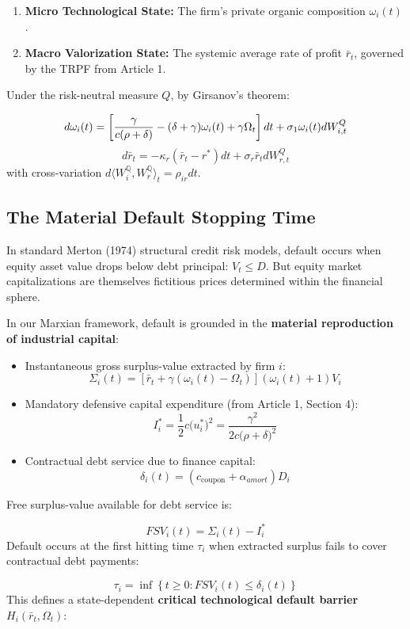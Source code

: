 \documentclass[11pt,letterpaper]{report}
\newcommand{\fitmath}[1]{\begingroup\setbox0=\hbox{$\displaystyle #1$}\ifdim\wd0>\linewidth\resizebox{\linewidth}{!}{$\displaystyle #1$}\else\displaystyle #1\fi\endgroup}
\begin{document}
\begin{enumerate}
\item \textbf{Micro Technological State:} The firm's private organic composition ${\omega }_{i}(t)$.
\item \textbf{Macro Valorization State:} The systemic average rate of profit ${\bar{r}}_{t}$, governed by the TRPF from Article 1.
\end{enumerate}
Under the risk-neutral measure $Q$, by Girsanov's theorem:

\[\fitmath{d{\omega }_{i}(t)=\left[{\frac{\gamma }{c(\rho +\delta )}-(\delta +\gamma ){\omega }_{i}(t)+\gamma {\Omega }_{t}}\right]dt+{\sigma }_{1}{\omega }_{i}(t)d{W}_{i,t}^{Q}}\]
\[
d{\bar{r}}_{t}=-{\kappa }_{r}({\bar{r}}_{t}-{r}^{*})dt+{\sigma }_{r}{\bar{r}}_{t}d{W}_{r,t}^{Q}
\]
with cross-variation $d\langle W_i^\mathbb{Q}, W_r^\mathbb{Q} \rangle_t = \rho_{ir} dt$.

\subsection{The Material Default Stopping Time}
In standard Merton (1974) structural credit risk models, default occurs when equity asset value drops below debt principal: ${V}_{t}\leq D$. But equity market capitalizations are themselves fictitious prices determined within the financial sphere.

In our Marxian framework, default is grounded in the \textbf{material reproduction of industrial capital}:

\begin{itemize}
\item Instantaneous gross surplus-value extracted by firm $i$:
\[
{\Sigma }_{i}(t)=\left[{{\bar{r}}_{t}+\gamma ({\omega }_{i}(t)-{\Omega }_{t})}\right]({\omega }_{i}(t)+1){V}_{i}
\]
\item Mandatory defensive capital expenditure (from Article 1, Section 4):
\[
{I}_{i}^{*}=\frac{1}{2}c({u}_{i}^{*}{)}^{2}=\frac{{\gamma }^{2}}{2c(\rho +\delta {)}^{2}}
\]
\item Contractual debt service due to finance capital:
\[
{\delta }_{i}(t)=({c}_{\mathrm{coupon}}+{\alpha }_{amort}){D}_{i}
\]
\end{itemize}
Free surplus-value available for debt service is:

\[
FS{V}_{i}(t)={\Sigma }_{i}(t)-{I}_{i}^{*}
\]
Default occurs at the first hitting time ${\tau }_{i}$ when extracted surplus fails to cover contractual debt payments:

\[
{\tau }_{i}=\inf \left\{{t\geq 0:FS{V}_{i}(t)\leq {\delta }_{i}(t)}\right\}
\]
This defines a state-dependent \textbf{critical technological default barrier} ${H}_{i}({\bar{r}}_{t},{\Omega }_{t})$:
\end{document}
